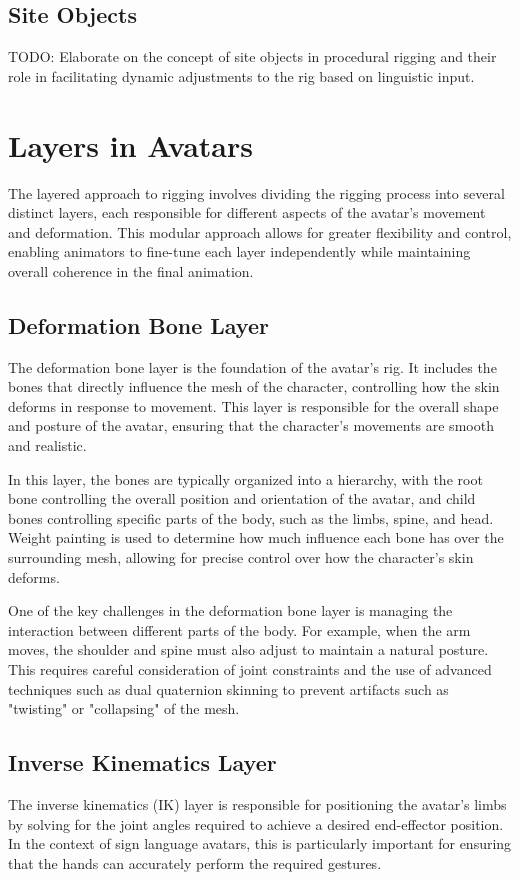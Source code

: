 \documentclass[../../main.tex]{subfiles}
\begin{document}
\subsection{Site Objects}
TODO: Elaborate on the concept of site objects in procedural rigging and their role in facilitating dynamic adjustments to the rig based on linguistic input.

\section{Layers in Avatars}
The layered approach to rigging involves dividing the rigging process into several distinct layers, each responsible for different aspects of the avatar's movement and deformation. This modular approach allows for greater flexibility and control, enabling animators to fine-tune each layer independently while maintaining overall coherence in the final animation.

\subsection{Deformation Bone Layer}
The deformation bone layer is the foundation of the avatar's rig. It includes the bones that directly influence the mesh of the character, controlling how the skin deforms in response to movement. This layer is responsible for the overall shape and posture of the avatar, ensuring that the character's movements are smooth and realistic.

In this layer, the bones are typically organized into a hierarchy, with the root bone controlling the overall position and orientation of the avatar, and child bones controlling specific parts of the body, such as the limbs, spine, and head. Weight painting is used to determine how much influence each bone has over the surrounding mesh, allowing for precise control over how the character's skin deforms.

One of the key challenges in the deformation bone layer is managing the interaction between different parts of the body. For example, when the arm moves, the shoulder and spine must also adjust to maintain a natural posture. This requires careful consideration of joint constraints and the use of advanced techniques such as dual quaternion skinning to prevent artifacts such as "twisting" or "collapsing" of the mesh.

\subsection{Inverse Kinematics Layer}
The inverse kinematics (IK) layer is responsible for positioning the avatar's limbs by solving for the joint angles required to achieve a desired end-effector position. In the context of sign language avatars, this is particularly important for ensuring that the hands can accurately perform the required gestures.
\end{document}
